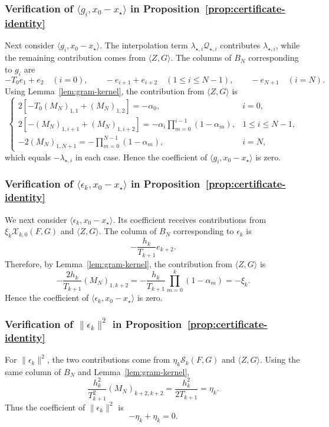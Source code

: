 \documentclass[11pt, hidelinks]{article}
\begin{document}
\subsubsection{Verification of $\langle g_i,x_0-x_\star\rangle$ in Proposition~\ref{prop:certificate-identity}}
Next consider $\langle g_i,x_0-x_\star\rangle$. The interpolation term $\lambda_{\star,i}\mathcal Q_{\star,i}$ contributes $\lambda_{\star,i}$, while the remaining contribution comes from $\langle Z,G\rangle$. The columns of $B_N$ corresponding to $g_i$ are
\[-T_0e_1+e_2\quad(i=0),\qquad -e_{i+1}+e_{i+2}\quad(1\le i\le N-1),\qquad
-e_{N+1}\quad(i=N). \]
Using Lemma~\ref{lem:gram-kernel}, the contribution from $\langle Z,G\rangle$ is \[ \begin{cases}
2\left[-T_0(M_N)_{1,1}+(M_N)_{1,2}\right]=-\alpha_0,&i=0,\\
2\left[-(M_N)_{1,i+1}+(M_N)_{1,i+2}\right]
=-\alpha_i\displaystyle\prod_{m=0}^{i-1}(1-\alpha_m),&1\le i\le N-1,\\
-2(M_N)_{1,N+1}
=-\displaystyle\prod_{m=0}^{N-1}(1-\alpha_m),&i=N,
\end{cases} \]
which equals $-\lambda_{\star,i}$ in each case. Hence the coefficient of $\langle g_i,x_0-x_\star\rangle$ is zero.
\subsubsection{Verification of $\langle\epsilon_k,x_0-x_\star\rangle$ in Proposition~\ref{prop:certificate-identity}}
We next consider $\langle\epsilon_k,x_0-x_\star\rangle$. Its coefficient receives contributions from $\xi_k\mathcal X_{k,0}(F,G)$ and $\langle Z,G\rangle$. The column of $B_N$ corresponding to $\epsilon_k$ is
\[ -\frac{h_k}{T_{k+1}}e_{k+2}. \]
Therefore, by Lemma~\ref{lem:gram-kernel}, the contribution from $\langle Z,G\rangle$ is
\[-\frac{2h_k}{T_{k+1}}(M_N)_{1,k+2} =-\frac{h_k}{T_{k+1}}\prod_{m=0}^{k}(1-\alpha_m) =-\xi_k.\]
Hence the coefficient of $\langle\epsilon_k,x_0-x_\star\rangle$ is zero.
\subsubsection{Verification of $\|\epsilon_k\|^2$ in Proposition~\ref{prop:certificate-identity}}
For $\|\epsilon_k\|^2$, the two contributions come from $\eta_k\mathcal S_k(F,G)$ and $\langle Z,G\rangle$. Using the same column of $B_N$ and Lemma~\ref{lem:gram-kernel},
\[ \frac{h_k^2}{T_{k+1}^2}(M_N)_{k+2,k+2} =\frac{h_k^2}{2T_{k+1}}
=\eta_k. \]
Thus the coefficient of $\|\epsilon_k\|^2$ is
\[ -\eta_k+\eta_k=0. \]
\end{document}
